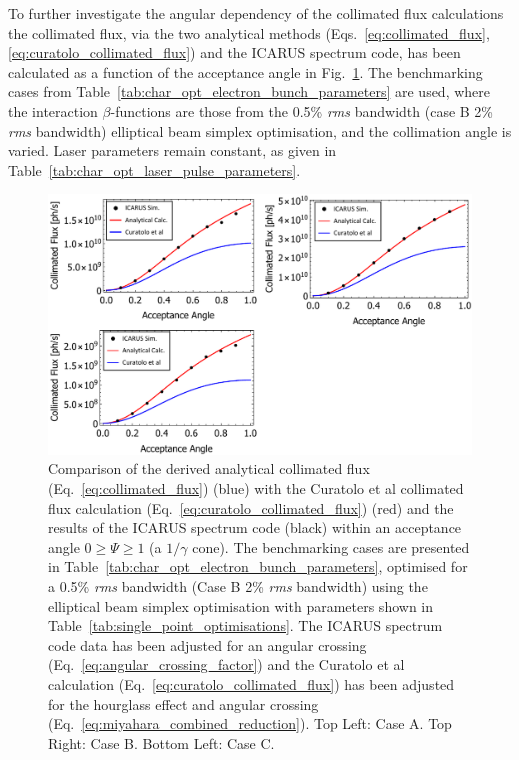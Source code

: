 \documentclass[../main.tex]{subfiles}
\begin{document}
To further investigate the angular dependency of the collimated flux calculations the collimated flux, via the two analytical methods (Eqs.~\ref{eq:collimated_flux}, \ref{eq:curatolo_collimated_flux}) and the \textsc{ICARUS} spectrum code, has been calculated as a function of the acceptance angle in Fig.~\ref{fig:curatolo_collimated_flux_comparison}. The benchmarking cases from Table~\ref{tab:char_opt_electron_bunch_parameters} are used, where the interaction $\beta$-functions are those from the 0.5\% \textit{rms} bandwidth (case B 2\% \textit{rms} bandwidth) elliptical beam simplex optimisation, and the collimation angle is varied. Laser parameters remain constant, as given in Table~\ref{tab:char_opt_laser_pulse_parameters}. 
\begin{figure}[!h]
\centering
\includegraphics[width=\textwidth]{Figures/Optimisation_and_Characterisation_of_Inverse_Compton_Scattering_Sources/Fcol_PSI_Cases_Curatolo_Analytical_ICARUS.pdf}
\caption{Comparison of the derived analytical collimated flux (Eq.~\ref{eq:collimated_flux}) (blue) with the Curatolo et al collimated flux calculation \cite{curatolo2017analytical}  (Eq.~\ref{eq:curatolo_collimated_flux}) (red) and the results of the \textsc{ICARUS} spectrum code (black) within an acceptance angle $0 \geq \Psi \geq 1$ (a $1/\gamma$ cone). The benchmarking cases are presented in Table~\ref{tab:char_opt_electron_bunch_parameters}, optimised for a 0.5\% \textit{rms} bandwidth (Case B 2\% \textit{rms} bandwidth) using the elliptical beam simplex optimisation with parameters shown in Table~\ref{tab:single_point_optimisations}. The \textsc{ICARUS} spectrum code data has been adjusted for an angular crossing (Eq.~\ref{eq:angular_crossing_factor}) and the Curatolo et al calculation (Eq.~\ref{eq:curatolo_collimated_flux}) has been adjusted for the hourglass effect and angular crossing (Eq.~\ref{eq:miyahara_combined_reduction}). Top Left: Case A. Top Right: Case B. Bottom Left: Case C.}
\label{fig:curatolo_collimated_flux_comparison}
\end{figure}
\end{document}
